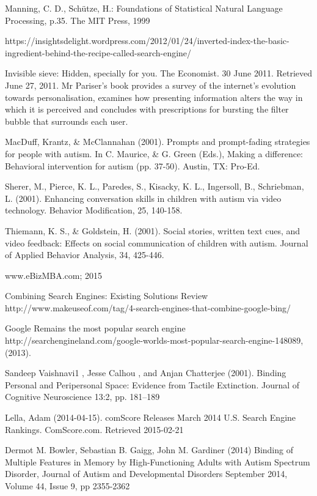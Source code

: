 \documentclass[10pt]{article}
\begin{document}
\begin{thebibliography}{100}
Manning, C. D., Schütze, H.: Foundations of Statistical Natural Language Processing, p.35. The MIT Press, 1999

https://insightsdelight.wordpress.com/2012/01/24/inverted-index-the-basic-ingredient-behind-the-recipe-called-search-engine/

 Invisible sieve: Hidden, specially for you. The Economist. 30 June 2011. Retrieved June 27, 2011. Mr Pariser’s book provides a survey of the internet’s evolution towards personalisation, examines how presenting information alters the way in which it is perceived and concludes with prescriptions for bursting the filter bubble that surrounds each user.

 MacDuff, Krantz, \& McClannahan (2001). Prompts and prompt-fading strategies for people with autism. In C. Maurice, \& G. Green (Eds.), Making a difference: Behavioral intervention for autism (pp. 37-50). Austin, TX: Pro-Ed.


Sherer, M., Pierce, K. L., Paredes, S., Kisacky, K. L., Ingersoll, B., Schriebman, L. (2001). Enhancing conversation skills in children with autism via video technology. Behavior Modification, 25, 140-158.


Thiemann, K. S., \& Goldstein, H. (2001). Social stories, written text cues, and video feedback: Effects on social communication of children with autism. Journal of Applied Behavior Analysis, 34, 425-446.

www.eBizMBA.com; 2015

Combining Search Engines: Existing Solutions Review
http://www.makeuseof.com/tag/4-search-engines-that-combine-google-bing/


Google Remains the most popular search engine http://searchengineland.com/google-worlds-most-popular-search-engine-148089, (2013).  


Sandeep Vaishnavi1 , Jesse Calhou , and Anjan Chatterjee (2001). Binding Personal and Peripersonal Space: Evidence from Tactile Extinction. Journal of Cognitive Neuroscience 13:2, pp. 181–189


Lella, Adam (2014-04-15). comScore Releases March 2014 U.S. Search Engine Rankings. ComScore.com. Retrieved 2015-02-21

Dermot M. Bowler, Sebastian B. Gaigg, John M. Gardiner (2014) Binding of Multiple Features in Memory by High-Functioning Adults with Autism Spectrum Disorder, Journal of Autism and Developmental Disorders September 2014, Volume 44, Issue 9, pp 2355-2362



\end{thebibliography}
\end{document}
